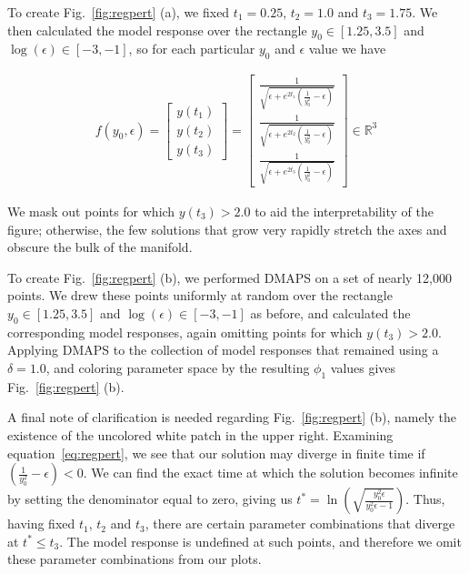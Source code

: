 To create Fig.~\ref{fig:regpert} (a), we fixed $t_1 = 0.25$,
$t_2 = 1.0$ and $t_3 = 1.75$. We then calculated the model response
over the rectangle $y_0 \in [1.25, 3.5]$ and $\log(\epsilon) \in [-3,
-1]$, so for each particular $y_0$ and $\epsilon$ value we have

\begin{align}
  f(y_0, \epsilon) = \begin{bmatrix} y(t_1) \\ y(t_2) \\
    y(t_3) \end{bmatrix} = \begin{bmatrix} \frac{1}{\sqrt{\epsilon + e^{2 t_1} \left(\frac{1}{y_0^2} -
  \epsilon \right)}} \\ 
\frac{1}{\sqrt{\epsilon + e^{2 t_2} \left(\frac{1}{y_0^2} -
      \epsilon \right)}} \\
\frac{1}{\sqrt{\epsilon + e^{2 t_3} \left(\frac{1}{y_0^2} -
      \epsilon \right)}}
\end{bmatrix} \in \mathbb{R}^3
\end{align}

We mask out points for which $y(t_3) > 2.0$ to aid the interpretability of
the figure; otherwise, the few solutions that grow very rapidly stretch
the axes and obscure the bulk of the manifold. 

To create Fig.~\ref{fig:regpert} (b), we performed DMAPS on a set
of nearly 12,000 points. We drew these points uniformly at random over
the rectangle $y_0 \in [1.25, 3.5]$ and $\log(\epsilon) \in [-3, -1]$
as before, and calculated the corresponding model responses, again
omitting points for which $y(t_3) > 2.0$. Applying DMAPS to the
collection of model responses that remained using a $\delta = 1.0$,
and coloring parameter space by the resulting $\phi_1$ values gives
Fig.~\ref{fig:regpert} (b).

A final note of clarification is needed regarding
Fig.~\ref{fig:regpert} (b), namely the existence of the uncolored
white patch in the upper right. Examining equation~\ref{eq:regpert},
we see that our solution may diverge in finite time if
$\left(\frac{1}{y_0^2} - \epsilon \right) < 0$. We can find the exact
time at which the solution becomes infinite by setting the denominator
equal to zero, giving us
$t^* = \ln \left( \sqrt{\frac{y_0^2 \epsilon}{y_0^2 \epsilon - 1}}
\right)$. Thus, having fixed $t_1$, $t_2$ and $t_3$, there are certain
parameter combinations that diverge at $t^* \le t_3$. The model
response is undefined at such points, and therefore we omit these
parameter combinations from our plots.


